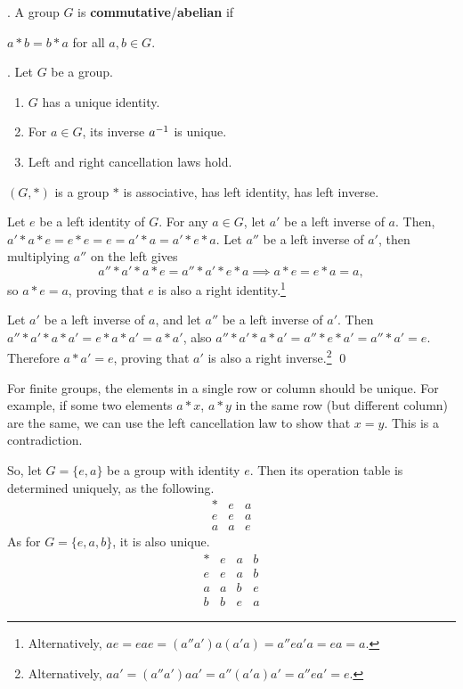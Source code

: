 .  A group \(G\) is \textbf{commutative}/\textbf{abelian} if
\begin{center}
    \(a * b = b * a\) for all \(a, b \in G\).
\end{center}

\prop.  Let \(G\) be a group.
\begin{enumerate}
    \item \(G\) has a unique identity.
    \item For \(a \in G\), its inverse \(a^{-1}\) is unique.
    \item Left and right cancellation laws hold.
\end{enumerate}

\rmk \((G, *)\) is a group \miff \(*\) is associative, has left identity, has left inverse.

\pf \note{\mimpd} Let \(e\) be a left identity of \(G\). For any \(a \in G\), let \(a'\) be a left inverse of \(a\). Then, \(a' * a * e = e * e = e = a' * a = a' * e * a\). Let \(a''\) be a left inverse of \(a'\), then multiplying \(a''\) on the left gives
\[
    a'' * a' * a * e = a'' * a' * e * a \implies a * e = e * a = a,
\]
so \(a * e = a\), proving that \(e\) is also a right identity.\footnote{Alternatively, \(a e = e a e = (a'' a') a (a' a) = a'' e a' a = e a = a\).}

Let \(a'\) be a left inverse of \(a\), and let \(a''\) be a left inverse of \(a'\). Then \(a'' * a' * a * a' = e * a * a' = a * a'\), also \(a'' * a' * a * a' = a'' * e * a' = a'' * a' = e\). Therefore \(a * a' = e\), proving that \(a'\) is also a right inverse.\footnote{Alternatively, \(aa' = (a'' a')a a' = a'' (a' a) a' = a'' e a' = e\).} \qed

\rmk For finite groups, the elements in a single row or column should be unique. For example, if some two elements \(a * x\), \(a * y\) in the same row (but different column) are the same, we can use the left cancellation law to show that \(x = y\). This is a contradiction.

So, let \(G = \{e, a\}\) be a group with identity \(e\). Then its operation table is determined uniquely, as the following.
\[
    \begin{array}{c|c|c}
        * & e & a \\ \hline
        e & e & a \\ \hline
        a & a & e
    \end{array}
\]
As for \(G = \{e, a, b\}\), it is also unique.
\[
    \begin{array}{c|c|c|c}
        * & e & a & b \\ \hline
        e & e & a & b \\ \hline
        a & a & b & e \\ \hline
        b & b & e & a
    \end{array}
\]

\smallskip
